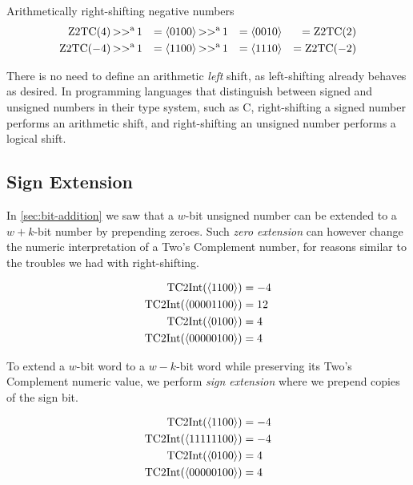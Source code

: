 \begin{example}{Arithmetically right-shifting negative numbers}
  \begin{align}
    \mathrm{Z2TC}(4) \operatorname{>>^{a}} 1 &&= \langle 0100 \rangle \operatorname{>>^{a}} 1 &&= \langle 0010 \rangle &&= \mathrm{Z2TC}(2) \\
    \mathrm{Z2TC}(-4) \operatorname{>>^{a}} 1 &&= \langle 1100 \rangle \operatorname{>>^{a}} 1 &&= \langle 1110 \rangle &&= \mathrm{Z2TC}(-2)
  \end{align}
\end{example}

There is no need to define an arithmetic \emph{left} shift, as
left-shifting already behaves as desired.  In programming languages
that distinguish between signed and unsigned numbers in their type
system, such as C, right-shifting a signed number performs an
arithmetic shift, and right-shifting an unsigned number performs a
logical shift.

\subsection{Sign Extension}
\label{sec:sign-extension}

In \cref{sec:bit-addition} we saw that a $w$-bit unsigned number can
be extended to a $w+k$-bit number by prepending zeroes.  Such
\emph{zero extension} can however change the numeric interpretation of
a Two's Complement number, for reasons similar to the troubles we had
with right-shifting.

\begin{example}
  \begin{align}
    \mathrm{TC2Int}(\langle 1100 \rangle) &= -4 \\
    \mathrm{TC2Int}(\langle 00001100 \rangle) &= 12 \\
    \mathrm{TC2Int}(\langle 0100 \rangle) &= 4 \\
    \mathrm{TC2Int}(\langle 00000100 \rangle) &= 4
  \end{align}
\end{example}

To extend a $w$-bit word to a $w-k$-bit word while preserving its
Two's Complement numeric value, we perform \emph{sign extension} where
we prepend copies of the sign bit.

\begin{example}
  \begin{align}
    \mathrm{TC2Int}(\langle 1100 \rangle) &= -4 \\
    \mathrm{TC2Int}(\langle 11111100 \rangle) &= -4 \\
    \mathrm{TC2Int}(\langle 0100 \rangle) &= 4 \\
    \mathrm{TC2Int}(\langle 00000100 \rangle) &= 4
  \end{align}
\end{example}

